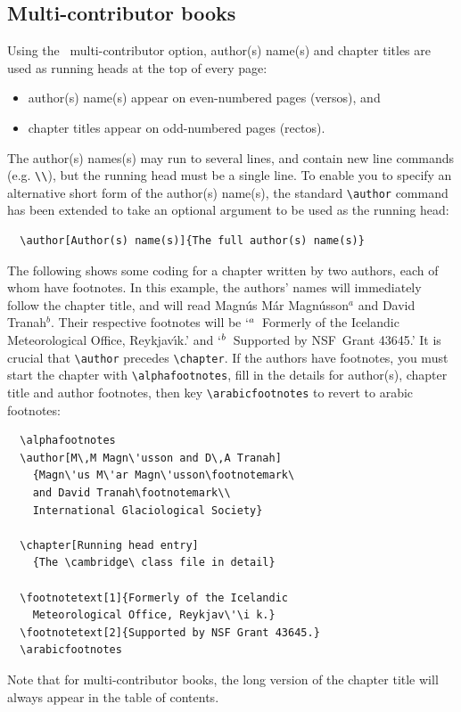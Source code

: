 \subsection{Multi-contributor books}
\label{multicontributor}

Using the \cambridge\ multi-contributor option, author(s) name(s) and chapter titles are used as running heads at the top of every page:
\begin{itemize}
\item author(s) name(s) appear on even-numbered pages (versos), and
\item chapter titles appear on odd-numbered pages (rectos).
\end{itemize}
The author(s) names(s) may run to several lines, and contain new line commands (e.g. \verb"\\"), but the running head must be a single line. To enable you to specify an alternative short form of the author(s) name(s), the standard \verb"\author" command has been extended to take an optional argument to be used as the running head:
\begin{verbatim}
  \author[Author(s) name(s)]{The full author(s) name(s)}
\end{verbatim}
The following shows some coding for a chapter written by two authors, each of whom have footnotes. In this example, the authors' names will immediately follow the chapter title, and will read Magn\'us M\'ar Magn\'usson$^{a}$ and David Tranah$^{b}$. Their respective footnotes will be `$^{a}\enskip$Formerly of the Icelandic Meteorological Office, Reykjav\'\i k.' and `$^{b}\enskip$Supported by NSF~Grant 43645.' It is crucial that \verb"\author" precedes \verb"\chapter". If the authors have footnotes, you must start the chapter with \verb"\alphafootnotes", fill in the details for author(s), chapter title and author footnotes, then key \verb"\arabicfootnotes" to revert to arabic footnotes:
\begin{verbatim}
  \alphafootnotes
  \author[M\,M Magn\'usson and D\,A Tranah]
    {Magn\'us M\'ar Magn\'usson\footnotemark\
    and David Tranah\footnotemark\\
    International Glaciological Society}

  \chapter[Running head entry]
    {The \cambridge\ class file in detail}

  \footnotetext[1]{Formerly of the Icelandic
    Meteorological Office, Reykjav\'\i k.}
  \footnotetext[2]{Supported by NSF Grant 43645.}
  \arabicfootnotes
\end{verbatim}
Note that for multi-contributor books, the long version of the chapter title will always appear in the table of contents.


